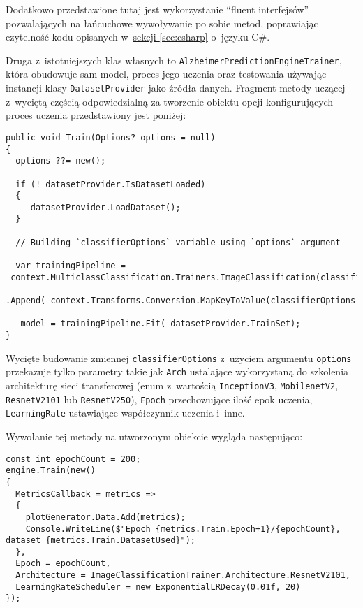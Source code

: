 Dodatkowo przedstawione tutaj jest wykorzystanie ``fluent interfejsów'' pozwalających na łańcuchowe wywoływanie po sobie metod, poprawiając czytelność kodu opisanych w~\hyperref[sec:csharp]{sekcji \ref*{sec:csharp}} o~języku C\#.

Druga z~istotniejszych klas własnych to \lstinline{AlzheimerPredictionEngineTrainer}, która obudowuje sam model, proces jego uczenia oraz testowania używając instancji klasy \lstinline{DatasetProvider} jako źródła danych.
Fragment metody uczącej z~wyciętą częścią odpowiedzialną za tworzenie obiektu opcji konfigurujących proces uczenia przedstawiony jest poniżej:

\begin{lstlisting}[language={[Sharp]C}]
public void Train(Options? options = null)
{
  options ??= new();

  if (!_datasetProvider.IsDatasetLoaded)
  {
    _datasetProvider.LoadDataset();
  }

  // Building `classifierOptions` variable using `options` argument

  var trainingPipeline = _context.MulticlassClassification.Trainers.ImageClassification(classifierOptions)
    .Append(_context.Transforms.Conversion.MapKeyToValue(classifierOptions.PredictedLabelColumnName));

  _model = trainingPipeline.Fit(_datasetProvider.TrainSet);
}
\end{lstlisting}

Wycięte budowanie zmiennej \lstinline{classifierOptions} z~użyciem argumentu \lstinline{options} przekazuje tylko parametry takie jak \lstinline{Arch} ustalające wykorzystaną do szkolenia architekturę sieci transferowej (enum z~wartością \lstinline{InceptionV3}, \lstinline{MobilenetV2}, \lstinline{ResnetV2101} lub \lstinline{ResnetV250}), \lstinline{Epoch} przechowujące ilość epok uczenia, \lstinline{LearningRate} ustawiające współczynnik uczenia i~inne.

Wywołanie tej metody na utworzonym obiekcie wygląda następująco:

\begin{lstlisting}[language={[Sharp]C}]
const int epochCount = 200;
engine.Train(new()
{
  MetricsCallback = metrics =>
  {
    plotGenerator.Data.Add(metrics);
    Console.WriteLine($"Epoch {metrics.Train.Epoch+1}/{epochCount}, dataset {metrics.Train.DatasetUsed}");
  },
  Epoch = epochCount,
  Architecture = ImageClassificationTrainer.Architecture.ResnetV2101,
  LearningRateScheduler = new ExponentialLRDecay(0.01f, 20)
});
\end{lstlisting}

